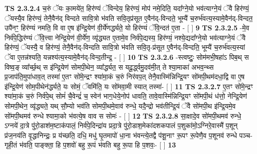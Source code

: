 \documentclass[17pt]{extarticle}
\begin{document}
                  \newline
                                \textbf{ TS 2.3.2.4} \newline
                  च॒रुं ॅयः का॒मये॑त॒ हिर॑ण्यं ॅविन्देय॒ हिर॑ण्यं॒ मोप॑ नमे॒दिति॒ यदा᳚ग्ने॒यो भव॑त्याग्ने॒यं ॅवै हिर॑ण्यं॒ ॅयस्यै॒व हिर॑ण्यं॒ तेनै॒वैन॑द् विन्दते सावि॒त्रो भ॑वति सवि॒तृप्र॑सूत ए॒वैन॑द्-विन्दते॒ भूम्यै॑ च॒रुर्भ॑वत्य॒स्यामे॒वैन॑द्-विन्दत॒ उपै॑नꣳ॒॒ हिर॑ण्यं नमति॒ वि वा ए॒ष इ॑न्द्रि॒येण॑ वी॒र्ये॑णर्द्ध्यते॒ यो हिर॑ण्यं ॅवि॒न्दत॑ ए॒ता - [  ] \textbf{  9} \newline
                  \newline
                                \textbf{ TS 2.3.2.5} \newline
                  -मे॒व निर्व॑पे॒द्धिर॑ण्यं ॅवि॒त्त्वा नेन्द्रि॒येण॑ वी॒र्ये॑ण॒ व्यृ॑द्ध्यत ए॒तामे॒व निर्व॑पे॒द्यस्य॒ हिर॑ण्यं॒ नश्ये॒द्यदा᳚ग्ने॒यो भव॑त्याग्ने॒यं ॅवै हिर॑ण्यं॒ ॅयस्यै॒ व हिर॑ण्यं॒ तेनै॒वैन॑द्-विन्दति सावि॒त्रो भ॑वति सवि॒तृ-प्र॑सूत ए॒वैन॑द्-विन्दति॒ भूम्यै॑ च॒रुर्भ॑वत्य॒स्यां ॅवा ए॒तन्न॑श्यति॒ यन्नश्य॑त्य॒स्यामे॒वैन॑द्-विन्द॒तीन्द्र॒ - [  ] \textbf{  10} \newline
                  \newline
                                \textbf{ TS 2.3.2.6} \newline
                  -स्त्वष्टुः॒ सोम॑मभी॒षहा॑ऽ पिब॒थ् स विष्व॒ङ् व्या᳚र्च्छ॒थ् स इ॑न्द्रि॒येण॑ सोमपी॒थेन॒ व्या᳚र्द्ध्यत॒ स यदू॒र्द्ध्वमु॒दव॑मी॒त् ते श्या॒माका॑ अभव॒न्थ्स प्र॒जाप॑ति॒मुपा॑धाव॒त् तस्मा॑ ए॒तꣳ सो॑मे॒न्द्रꣳ श्या॑मा॒कं च॒रुं निर॑वप॒त् तेनै॒वास्मि॑न्निन्द्रि॒यꣳ सो॑मपी॒थम॑दधा॒द्वि वा ए॒ष इ॑न्द्रि॒येण॑ सोम॒पीथेन॑र्द्ध्यते॒ यः सोमं॒ ॅवमि॑ति॒ यः सो॑मवा॒मी स्यात् तस्मा॑-  [  ] \textbf{  11} \newline
                  \newline
                                \textbf{ TS 2.3.2.7} \newline
                  ए॒तꣳ सो॑मे॒न्द्रꣳ श्या॑मा॒कं च॒रुं निर्व॑पे॒थ् सोमं॑ चै॒वेन्द्रं॑ च॒ स्वेन॑ भाग॒धेये॒नोप॑ धावति॒ तावे॒वास्मि॑न्निन्द्रि॒यꣳ सो॑मपी॒थं ध॑त्तो॒ नेन्द्रि॒येण॑ सोमपी॒थेन॒ व्यृ॑द्ध्यते॒ यथ् सौ॒म्यो भव॑ति सोमपी॒थमे॒वाव॑ रुन्धे॒ यदै॒न्द्रो भव॑तीन्द्रि॒यं ॅवै सो॑मपी॒थ इ॑न्द्रि॒यमे॒व सो॑मपी॒थमव॑ रुन्धे श्यामा॒को भ॑वत्ये॒ष वाव स सोमः॑ - [  ] \textbf{  12} \newline
                  \newline
                                \textbf{ TS 2.3.2.8} \newline
                  सा॒क्षादे॒व सो॑मपी॒थमव॑ रुन्धे॒ ऽग्नये॑ दा॒त्रे पु॑रो॒डाश॑म॒ष्टाक॑पालं॒ निर्व॑पे॒दिन्द्रा॑य प्रदा॒त्रे पु॑रो॒डाश॒मेका॑दशकपालं प॒शुका॑मो॒ऽग्निरे॒वास्मै॑ प॒शून् प्र॑ज॒नय॑ति वृ॒द्धानिन्द्रः॒ प्र य॑च्छति॒ दधि॒ मधु॑ घृ॒तमापो॑ धा॒ना भ॑वन्त्ये॒तद्वै प॑शू॒नाꣳ रू॒पꣳ रू॒पेणै॒व प॒शूनव॑ रुन्धे पञ्च-गृही॒तं भ॑वति॒ पाङ्क्ता॒ हि प॒शवो॑ बहु रू॒पं भ॑वति बहु रू॒पा हि प॒शवः॒-  [  ] \textbf{  13} \newline
\end{document}
